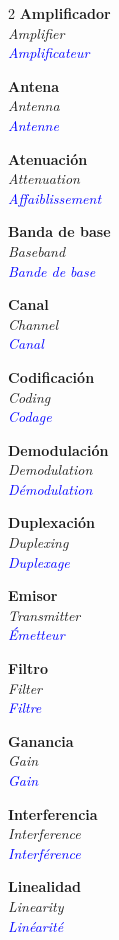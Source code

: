 \documentclass[a4paper,10pt]{article}
\begin{document}
\begin{multicols}{2}
\small
\textbf{Amplificador}\\
\textit{Amplifier}\\
\textcolor{blue}{\textit{Amplificateur}}

\textbf{Antena}\\
\textit{Antenna}\\
\textcolor{blue}{\textit{Antenne}}

\textbf{Atenuaci\'on}\\
\textit{Attenuation}\\
\textcolor{blue}{\textit{Affaiblissement}}

\textbf{Banda de base}\\
\textit{Baseband}\\
\textcolor{blue}{\textit{Bande de base}}

\textbf{Canal}\\
\textit{Channel}\\
\textcolor{blue}{\textit{Canal}}

\textbf{Codificaci\'on}\\
\textit{Coding}\\
\textcolor{blue}{\textit{Codage}}

\textbf{Demodulaci\'on}\\
\textit{Demodulation}\\
\textcolor{blue}{\textit{D\'emodulation}}

\textbf{Duplexaci\'on}\\
\textit{Duplexing}\\
\textcolor{blue}{\textit{Duplexage}}

\textbf{Emisor}\\
\textit{Transmitter}\\
\textcolor{blue}{\textit{\'Emetteur}}

\textbf{Filtro}\\
\textit{Filter}\\
\textcolor{blue}{\textit{Filtre}}

\textbf{Ganancia}\\
\textit{Gain}\\
\textcolor{blue}{\textit{Gain}}

\textbf{Interferencia}\\
\textit{Interference}\\
\textcolor{blue}{\textit{Interf\'erence}}

\textbf{Linealidad}\\
\textit{Linearity}\\
\textcolor{blue}{\textit{Lin\'earit\'e}}


\end{multicols}
\end{document}
